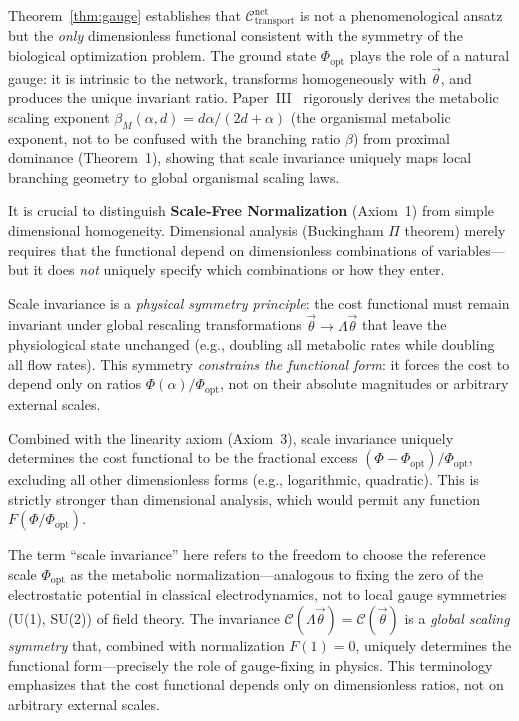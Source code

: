 \begin{remark}
Theorem~\ref{thm:gauge} establishes that
$\mathcal{C}_{\mathrm{transport}}^{\mathrm{net}}$ is not a phenomenological
ansatz but the \emph{only} dimensionless functional consistent with the symmetry
of the biological optimization problem. The ground state $\Phi_{\mathrm{opt}}$
plays the role of a natural gauge: it is intrinsic to the network, transforms
homogeneously with $\vec{\theta}$, and produces the unique invariant ratio.
Paper~III~\cite{paperIII} rigorously derives the metabolic scaling exponent
$\beta_M(\alpha,d) = d\alpha/(2d+\alpha)$ (the organismal metabolic
exponent, not to be confused with the branching ratio $\beta$) from proximal
dominance (Theorem~1), showing that scale invariance uniquely maps local
branching geometry to global organismal scaling laws.
\end{remark}

\begin{remark}
\label{rem:gauge_vs_dimensional}
It is crucial to distinguish \textbf{Scale-Free Normalization} (Axiom~1) from
simple dimensional homogeneity. Dimensional analysis (Buckingham $\Pi$ theorem)
merely requires that the functional depend on dimensionless combinations of
variables---but it does \emph{not} uniquely specify which combinations or how
they enter.

Scale invariance is a \emph{physical symmetry principle}: the cost functional
must remain invariant under global rescaling transformations $\vec{\theta} \to
\Lambda\vec{\theta}$ that leave the physiological state unchanged (e.g.,
doubling all metabolic rates while doubling all flow rates). This symmetry
\emph{constrains the functional form}: it forces the cost to depend only on
ratios $\Phi(\alpha)/\Phi_{\mathrm{opt}}$, not on their absolute magnitudes or
arbitrary external scales.

Combined with the linearity axiom (Axiom~3), scale invariance uniquely
determines the cost functional to be the fractional excess $(\Phi -
\Phi_{\mathrm{opt}})/\Phi_{\mathrm{opt}}$, excluding all other dimensionless
forms (e.g., logarithmic, quadratic). This is strictly stronger than dimensional
analysis, which would permit any function $F(\Phi/\Phi_{\mathrm{opt}})$.
\end{remark}

\begin{remark}
\label{rem:gauge_terminology}
The term ``scale invariance'' here refers to the freedom to choose the reference
scale $\Phi_{\mathrm{opt}}$ as the metabolic normalization—analogous to
fixing the zero of the electrostatic potential in classical electrodynamics, not
to local gauge symmetries (U(1), SU(2)) of field theory. The invariance
$\mathcal{C}(\Lambda\vec{\theta}) = \mathcal{C}(\vec{\theta})$ is a \emph{global
scaling symmetry} that, combined with normalization $F(1)=0$, uniquely
determines the functional form—precisely the role of gauge-fixing in physics.
This terminology emphasizes that the cost functional depends only on
dimensionless ratios, not on arbitrary external scales.
\end{remark}


